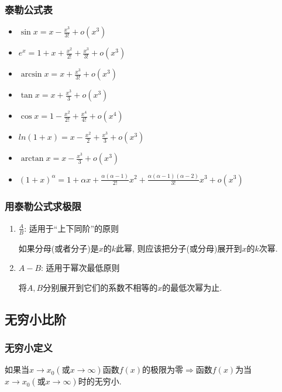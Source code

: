 \subsubsection{泰勒公式表}
\begin{multicols}{2}
\begin{itemize}
\item $ \sin x=x-\frac{x^{3}}{3!}+o(x^{3}) $
\item $ e^{x}=1+x+\frac{x^{2}}{2!}+\frac{x^{3}}{3!}+o(x^{3}) $
\item $ \arcsin x=x+\frac{x^{3}}{3!}+o(x^{3}) $
\item $ \tan x=x+\frac{x^{3}}{3}+o(x^{3}) $
\item $ \cos x=1-\frac{x^{2}}{2!}+\frac{x^{4}}{4!}+o(x^{4}) $
\item $ ln(1+x)=x-\frac{x^{2}}{2}+\frac{x^{3}}{3}+o(x^{3}) $
\item $ \arctan x=x-\frac{x^{3}}{3}+o(x^{3}) $
\item $ (1+x)^{\alpha}=1+\alpha x+\frac{\alpha (\alpha -1)}{2!}x^{2}+\frac{\alpha (\alpha -1)(\alpha -2)}{3!}x^{3}+o(x^{3}) $
\end{itemize}
\end{multicols}
\subsubsection{用泰勒公式求极限}
\begin{enumerate}
\item $ \frac{A}{B} $: 适用于``上下同阶''的原则 \par
如果分母(或者分子)是$ x $的$ k $此幂, 则应该把分子(或分母)展开到$ x $的$ k $次幂.
\item $ A-B $: 适用于幂次最低原则 \par
将$ A, B $分别展开到它们的系数不相等的$ x $的最低次幂为止.
\end{enumerate}
\subsection{无穷小比阶}
\subsubsection{无穷小定义}
如果当$ x\rightarrow x_{0}(\text{或}x\rightarrow \infty) $函数$ f(x) $的极限为零$ \Rightarrow  $函数$ f(x) $为当$ x \rightarrow x_{0}(\text{或}x \rightarrow \infty ) $时的无穷小.
